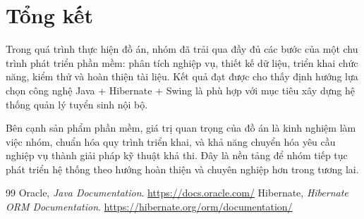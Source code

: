 \documentclass[12pt,a4paper,oneside]{report}
\begin{document}
\section{Tổng kết}
Trong quá trình thực hiện đồ án, nhóm đã trải qua đầy đủ các bước của một chu trình phát triển phần mềm: phân tích nghiệp vụ, thiết kế dữ liệu, triển khai chức năng, kiểm thử và hoàn thiện tài liệu. Kết quả đạt được cho thấy định hướng lựa chọn công nghệ Java + Hibernate + Swing là phù hợp với mục tiêu xây dựng hệ thống quản lý tuyển sinh nội bộ.

Bên cạnh sản phẩm phần mềm, giá trị quan trọng của đồ án là kinh nghiệm làm việc nhóm, chuẩn hóa quy trình triển khai, và khả năng chuyển hóa yêu cầu nghiệp vụ thành giải pháp kỹ thuật khả thi. Đây là nền tảng để nhóm tiếp tục phát triển hệ thống theo hướng hoàn thiện và chuyên nghiệp hơn trong tương lai.

\begin{thebibliography}{99}
 Oracle, \textit{Java Documentation}. \url{https://docs.oracle.com/}
 Hibernate, \textit{Hibernate ORM Documentation}. \url{https://hibernate.org/orm/documentation/}
\end{thebibliography}
\end{document}
